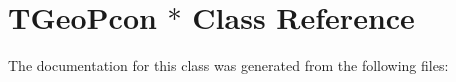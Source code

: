 \hypertarget{class_t_geo_pcon_01_5}{}\section{T\+Geo\+Pcon $\ast$ Class Reference}
\label{class_t_geo_pcon_01_5}


The documentation for this class was generated from the following files\+: